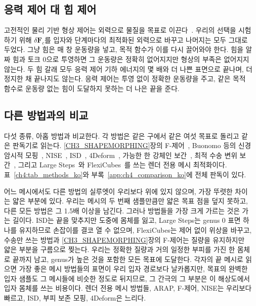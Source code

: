 \subsection{응력 제어 대 힘 제어}
\label{ch4:sec_force_ko}
고전적인 물리 기반 형상 제어는 외력으로 물질을 목표로 이끈다~\citep{treuille2003keyframe,mcnamara2004adjoint,fattal2004targetdriven,chen2024eigenfluids,li2025flowmapadjoint}.
우리의 선택을 시험하기 위해 $\delta\mathbf{F}_c$를 입자와 단계마다의 최적화된 외력으로 바꾸고 나머지는 모두 그대로 두었다.
그냥 힘은 매 창 운동량을 넣고, 목적 함수가 이를 다시 끌어와야 한다. 힘을 알짜 힘과 토크 0으로 투영하면 그 운동량은 정확히
없어지지만 형상의 부족은 없어지지 않는다. 두 힘 갈래 모두 응력 제어 기하 에너지의 몇 배와 더 나쁜 표면으로 끝나며, 더 정지한
채 끝나지도 않는다. 응력 제어는 투영 없이 정확한 운동량을 주고, 같은 목적 함수로 운동량 없는 힘이 도달하지 못하는 더 나은
끝을 준다.

\subsection{다른 방법과의 비교}
\label{ch4:sec_comparison_ko}
다섯 종류, 아홉 방법과 비교한다. 각 방법은 같은 구에서 같은 여섯 목표로 돌리고 같은 판독기로 읽는다.
\ref{CH3_SHAPEMORPHING}장의 F-제어~\citep{11088224}, Buonomo 등의 신경 암시적 모핑~\citep{buonomo2025vpnsm},
NISE~\citep{novello2023nise}, ISD~\citep{sang2025isd}, 4Deform~\citep{sang2025fourdeform}, 가능한 한 강체인
보간~\citep{alexa2000arap}, 최적 수송 변위 보간~\citep{mccann1997convexity,bonneel2011displacement}, 그리고 Large
Steps~\citep{nicolet2021largesteps}와 FlexiCubes~\citep{shen2023flexicubes}를 쓰는 렌더 전용 메시 최적화이다. 표~\ref{ch4:tab_methods_ko}와
부록~\ref{app:ch4_comparison_ko}에 전체 판독이 있다.

어느 메시에서도 다른 방법의 실루엣이 우리보다 위에 있지 않으며, 가장 뚜렷한 차이는 얇은 부분에 있다. 우리는 메시의 두 번째
샘플만큼만 얇은 목표 점을 덮지 못하고, 다른 모든 방법은 그 1.5배 이상을 남긴다. 그러나 방법들을 가장 크게 가르는 것은 가는
길이다. ISD는 끝을 맞추지만 도중에 몸체를 잃고, Large Steps는 genus 0 표면 하나를 유지하므로 손잡이를 결코 열 수 없으며,
FlexiCubes는 제어 없이 위상을 바꾸고, 수송만 쓰는 방법과 \ref{CH3_SHAPEMORPHING}장의 F-제어는 질량을 유지하지만 얇은 부분을
구름으로 찢는다. 우리는 정확한 질량과 거의 일정한 부피를 가진 한 몸체로 끝까지 남고, genus가 높은 것을 포함한 모든 목표에
도달한다. 각자의 끝 메시로 읽으면 가장 좋은 메시 방법들의 표면이 우리 입자 경로보다 날카롭지만, 목표의 완벽한 입자 샘플도 그
메시들에 비슷한 정도로 뒤지므로, 그 간극의 그 부분은 이 해상도에서 입자 몸체를 쓰는 비용이다. 렌더 전용 메시 방법들, ARAP,
F-제어, NISE는 우리보다 빠르고, ISD, 부피 보존 모핑, 4Deform은 느리다.


